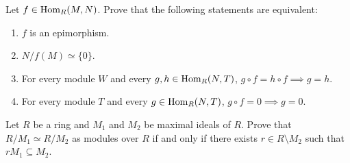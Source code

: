 \begin{exercise}
Let $f\in\operatorname{Hom}_R(M,N)$. Prove that the following statements are equivalent: 
\begin{enumerate}
\item $f$ is an epimorphism.
\item $N/f(M)\simeq\{0\}$. 
\item For every module $W$ and every $g,h\in\operatorname{Hom}_R(N,T)$, $g\circ f=h\circ f\implies g=h$.
\item For every module $T$ and every $g\in\operatorname{Hom}_R(N,T)$, $g\circ f=0\implies g=0$. 
\end{enumerate}
\end{exercise}

\begin{exercise}
\label{xca:mod_iso_max}
    Let $R$ be a ring and $M_1$ and $M_2$ be maximal ideals of $R$. Prove that
    $R/M_1\simeq R/M_2$ as modules over $R$ if and only if there exists
    $r\in R\setminus M_2$ such that $rM_1\subseteq M_2$. 
\end{exercise}





